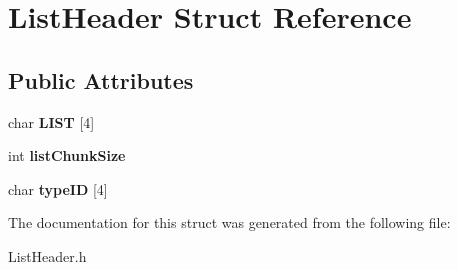 \hypertarget{structListHeader}{}\section{List\+Header Struct Reference}
\label{structListHeader}
\subsection*{Public Attributes}
\begin{DoxyCompactItemize}
\item 
\mbox{\label{structListHeader_a6de963dff7ecaa24b7dd16cef513bb9c}} 
char {\bfseries L\+I\+ST} \mbox{[}4\mbox{]}
\item 
\mbox{\label{structListHeader_a4f347f9e217e8bc0723975ecd7975282}} 
int {\bfseries list\+Chunk\+Size}
\item 
\mbox{\label{structListHeader_a8a4260170092fefe13be38605ef2e239}} 
char {\bfseries type\+ID} \mbox{[}4\mbox{]}
\end{DoxyCompactItemize}


The documentation for this struct was generated from the following file\+:\begin{DoxyCompactItemize}
\item 
List\+Header.\+h\end{DoxyCompactItemize}
